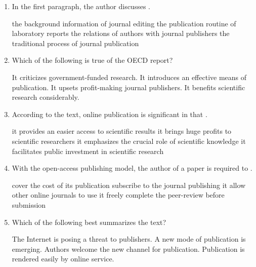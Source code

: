 \begin{enumerate}[resume]
	\item
In the first paragraph, the author discusses \lineread.


\fourchoices
{the background information of journal editing}
{the publication routine of laboratory reports}
{the relations of authors with journal publishers}
{the traditional process of journal publication}



\item
Which of the following is true of the OECD report?


\fourchoices
{It criticizes government-funded research.}
{It introduces an effective means of publication.}
{It upsets profit-making journal publishers.}
{It benefits scientific research considerably.}



\item
According to the text, online publication is significant in
that \lineread.


\fourchoices
{it provides an easier access to scientific results}
{it brings huge profits to scientific researchers}
{it emphasizes the crucial role of scientific knowledge}
{it facilitates public investment in scientific research}



\item
With the open-access publishing model, the author of a paper
is required to \lineread.


\fourchoices
{cover the cost of its publication}
{subscribe to the journal publishing it}
{allow other online journals to use it freely}
{complete the peer-review before submission}



\item
 Which of the following best summarizes the text?


\fourchoices
{The Internet is posing a threat to publishers.}
{A new mode of publication is emerging.}
{Authors welcome the new channel for publication.}
{Publication is rendered easily by online service.}


	
\end{enumerate}


